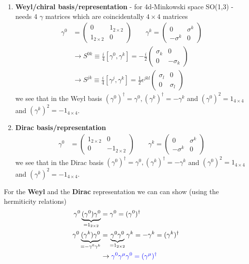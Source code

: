 \documentclass[10pt,a4paper]{report}
\theoremstyle{definition}
\begin{document}
\begin{enumerate}
\item {\bf Weyl/chiral basis/representation} - for 4d-Minkowski space SO(1,3) - needs 4 $\gamma$ matrices which are coincidentally $4\times4$ matrices
\begin{align}
\gamma^0&=\left(\begin{array}{cc}0 &1_{2\times2}\\1_{2\times2} &0\end{array}\right)
\qquad
\gamma^k=\left(\begin{array}{cc}0 & \sigma^k\\ -\sigma^k &0\end{array}\right)\\
&\rightarrow S^{0k}\equiv\frac{i}{4}[\gamma^0,\gamma^k]=-\frac{i}{2}\left(\begin{array}{cc}\sigma_k &0\\0 &-\sigma_k\end{array}\right)\\
&\rightarrow S^{jk}\equiv\frac{i}{4}[\gamma^j,\gamma^k]=\frac{1}{2}\epsilon^{jkl}\left(\begin{array}{cc}\sigma_l &0\\0 &\sigma_l\end{array}\right)
\end{align}
we see that in the Weyl basis $(\gamma^0)^\dagger=\gamma^0, (\gamma^k)^\dagger=-\gamma^k$ and $(\gamma^0)^2=1_{4\times4}$ and $(\gamma^k)^2=-1_{4\times4}$.

\item {\bf Dirac basis/representation}
\begin{align}
\gamma^0&=\left(\begin{array}{cc}1_{2\times2}&0\\0&-1_{2\times2}\end{array}\right)\qquad
\gamma^k=\left(\begin{array}{cc}0 & \sigma^k\\ -\sigma^k &0\end{array}\right)
\end{align}
we see that in the Dirac basis $(\gamma^0)^\dagger=\gamma^0, (\gamma^k)^\dagger=-\gamma^k$ and $(\gamma^0)^2=1_{4\times4}$ and $(\gamma^k)^2=-1_{4\times4}$.
\end{enumerate}
For the {\bf Weyl} and the {\bf Dirac} representation we can can show (using the hermiticity relations)
\begin{align}
\gamma^0\underbrace{(\gamma^0)\gamma^0}_{=1_{2\times2}}&=\gamma^0=(\gamma^0)^\dagger\\
\gamma^0\underbrace{(\gamma^k)\gamma^0}_{=-\gamma^0\gamma^k}&=\underbrace{\gamma^0\gamma^0}_{=1_{2\times2}}\gamma^k=-\gamma^k=(\gamma^k)^\dagger\\
&\rightarrow\textcolor{blue}{ \gamma^0\gamma^\mu\gamma^0=(\gamma^\mu)^\dagger}
\end{align}
\end{document}
